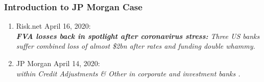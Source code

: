 \documentclass[main.tex]{subfiles}
\begin{document}
    \begin{frame}
        \frametitle{Introduction to JP Morgan Case}

        \begin{enumerate}
            \item Risk.net April 16, 2020: \\
            \textit{%
                \textbf{FVA losses back in spotlight after coronavirus stress:} 
                Three US banks suffer combined loss of almost 
                \$2bn after rates and funding double whammy.
            }
            \item JP Morgan April 14, 2020: \\
            \textit{%
                \underline{} 
                within Credit Adjustments \& Other in corporate and investment banks 
                \underline{}.
            }
        \end{enumerate}

        \begin{center}
            \resizebox{.85\textwidth}{!}{%
                
            }
        \end{center}
    \end{frame}
\end{document}
